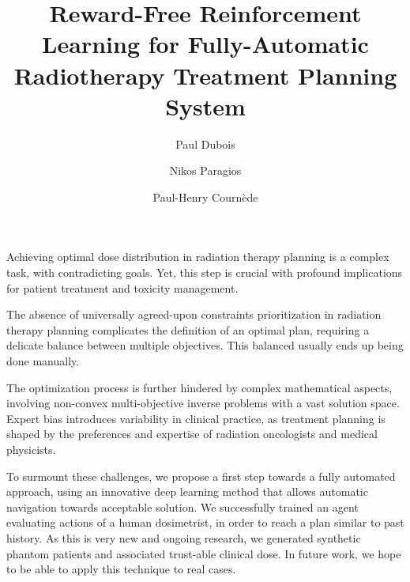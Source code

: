 \documentclass[11pt,twocolumn,twoside]{article}
\begin{document}
\title{Reward-Free Reinforcement Learning for Fully-Automatic Radiotherapy Treatment Planning System}

\author[1,2]{Paul Dubois}
\author[1]{Nikos Paragios}
\author[2]{Paul-Henry Cournède}



\maketitle
\thispagestyle{fancy}





\begin{customabstract}
	Achieving optimal dose distribution in radiation therapy planning is a complex task, with contradicting goals.
	Yet, this step is crucial with profound implications for patient treatment and toxicity management.
	
	The absence of universally agreed-upon constraints prioritization in radiation therapy planning complicates the definition of an optimal plan, requiring a delicate balance between multiple objectives.
	This balanced usually ends up being done manually.
	
	The optimization process is further hindered by complex mathematical aspects, involving non-convex multi-objective inverse problems with a vast solution space.
	Expert bias introduces variability in clinical practice, as treatment planning is shaped by the preferences and expertise of radiation oncologists and medical physicists.
	
	To surmount these challenges, we propose a first step towards a fully automated approach, using an innovative deep learning method that allows automatic navigation towards acceptable solution.
	We successfully trained an agent evaluating actions of a human dosimetrist, in order to reach a plan similar to past history.
	As this is very new and ongoing research, we generated synthetic phantom patients and associated trust-able clinical dose.
	In future work, we hope to be able to apply this technique to real cases.
\end{customabstract}
\end{document}
